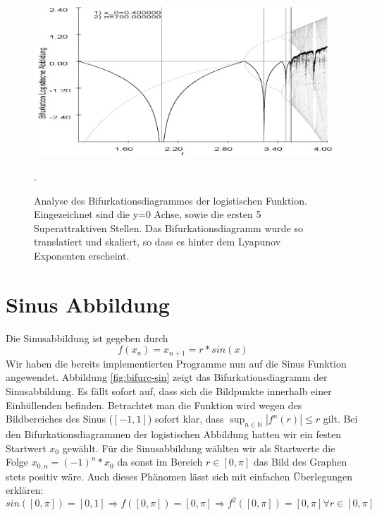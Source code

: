 \documentclass{scrartcl}
\begin{document}
\begin{figure}
\centering
\includegraphics[scale=0.45]{iteration/bifurk-log-lyapunov-periode}
\caption{Analyse des Bifurkationsdiagrammes der logistischen Funktion. Eingezeichnet sind die y=0 Achse, sowie die ersten 5 Superattraktiven Stellen. Das Bifurkationsdiagramm wurde so translatiert und skaliert, so dass es hinter dem Lyapunov Exponenten erscheint.}.
\label{fix:log-detail} 
\end{figure}







\section{Sinus Abbildung}
Die Sinusabbildung ist gegeben durch 
$$f(x_n)=x_{n+1}=r*sin(x)$$
Wir haben die bereits implementierten Programme nun auf die Sinus Funktion angewendet. Abbildung \ref{fig:bifurc-sin} zeigt das Bifurkationsdiagramm der Sinusabbildung. Es fällt sofort auf, dass sich die Bildpunkte innerhalb einer Einhüllenden befinden. Betrachtet man die Funktion wird wegen des Bildbereiches des Sinus ($[-1,1]$) sofort klar, dass $\sup_{n \in \mathbb{N}} |f^n(r)| \leq r $ gilt. Bei den Bifurkationsdiagrammen der logistischen Abbildung hatten wir ein festen Startwert $x_0$ gewählt. Für die Sinusabbildung wählten wir als Startwerte die Folge $x_{0,n} = (-1)^n * x_0$ da sonst im Bereich $r \in [0,\pi]$ das Bild des Graphen stets positiv wäre. Auch dieses Phänomen lässt sich mit einfachen Überlegungen erklären: 
$$sin([0,\pi]) = [0,1] \Rightarrow f([0,\pi]) = [0,\pi] \Rightarrow f^2([0,\pi]) = [0,\pi] \forall r \in [0,\pi]$$
 
\end{document}

